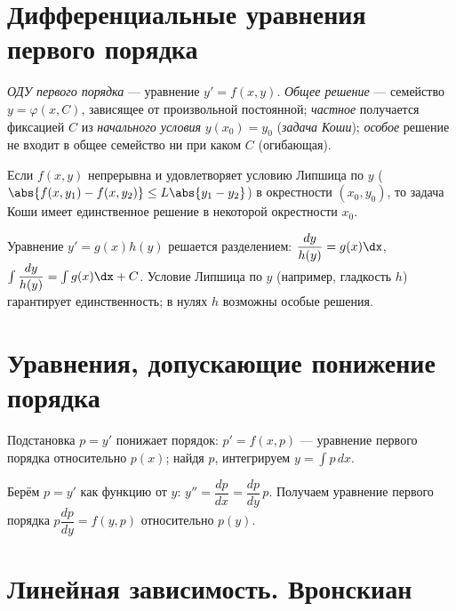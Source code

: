 \section{Дифференциальные уравнения первого порядка}

\begin{definition}
\emph{ОДУ первого порядка} — уравнение $y'=f(x,y)$. \emph{Общее решение} — семейство
$y=\varphi(x,C)$, зависящее от произвольной постоянной; \emph{частное} получается фиксацией $C$ из
\emph{начального условия} $y(x_0)=y_0$ (\emph{задача Коши}); \emph{особое} решение не входит в общее
семейство ни при каком $C$ (огибающая).
\end{definition}

\begin{theorem}
Если $f(x,y)$ непрерывна и удовлетворяет условию Липшица по $y$
($\abs{f(x,y_1)-f(x,y_2)}\le L\abs{y_1-y_2}$) в окрестности $(x_0,y_0)$, то задача Коши имеет
единственное решение в некоторой окрестности $x_0$.
\end{theorem}

\begin{remark}
Уравнение $y'=g(x)h(y)$ решается разделением: $\dfrac{dy}{h(y)}=g(x)\dx$, $\int\dfrac{dy}{h(y)}=\int g(x)\dx+C$.
Условие Липшица по $y$ (например, гладкость $h$) гарантирует единственность; в нулях $h$ возможны
особые решения.
\end{remark}

\section{Уравнения, допускающие понижение порядка}

\begin{property}[нет явной $y$: $y''=f(x,y')$]
Подстановка $p=y'$ понижает порядок: $p'=f(x,p)$ — уравнение первого порядка относительно $p(x)$;
найдя $p$, интегрируем $y=\int p\,dx$.
\end{property}

\begin{property}[нет явной $x$: $y''=f(y,y')$]
Берём $p=y'$ как функцию от $y$: $y''=\dfrac{dp}{dx}=\dfrac{dp}{dy}\,p$. Получаем уравнение первого
порядка $p\dfrac{dp}{dy}=f(y,p)$ относительно $p(y)$.
\end{property}

\section{Линейная зависимость. Вронскиан}

